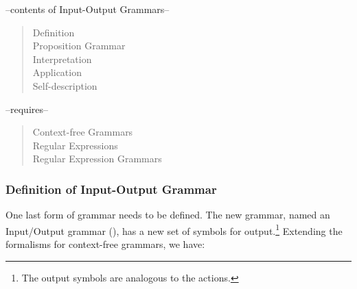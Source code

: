 




\begin{center}
\begin{small}
\noindent --contents of Input-Output Grammars--
\begin{quote}
\raggedright
Definition\\
Proposition Grammar\\
Interpretation\\
Application\\
Self-description\\
\end{quote}
--requires--
\begin{quote}
\raggedright
Context-free Grammars\\
Regular Expressions\\
Regular Expression Grammars\\
\end{quote}
\end{small}
\end{center}

\vspace{1em}

\vspace{1em}

\subsubsection{Definition of Input-Output Grammar}

One last form of grammar needs to be defined.  The new grammar, named
an Input/Output grammar (\iog), 
has a new set of symbols for output.\footnote{The 
output symbols are analogous to the  actions.}
Extending the formalisms for context-free grammars, we have:

